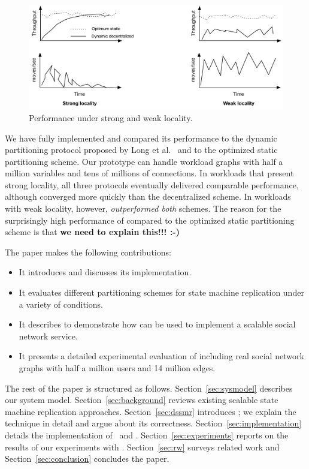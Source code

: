 \begin{figure}[ht]
	\center
	\includegraphics[width=0.6\linewidth]{figures/motivation}
	\caption{Performance under strong and weak locality.}
	\label{fig:motivation}
\end{figure}



\smallskip


We have fully implemented \dynastar and compared its performance to
the dynamic partitioning protocol proposed by Long et
al.~\cite{hoang2016} and to the optimized static partitioning scheme.
Our prototype can handle workload graphs with half a million variables
and tens of millions of connections.  In workloads that present strong
locality, all three protocols eventually delivered comparable
performance, although \dynastar converged more quickly than the
decentralized scheme.  In workloads with weak locality, however,
\dynastar \emph{outperformed both} schemes.  The reason for the
surprisingly high performance of \dynastar compared to the optimized
static partitioning scheme is that \textbf{we need to explain this!!!
  :-)}

The paper makes the following contributions:
\begin{itemize}
\item It introduces \dynastar and discusses its implementation. 
\item It evaluates different partitioning schemes for state machine replication under a variety of conditions.
\item It describes \appname{} to demonstrate how \libname{} can be used to implement a scalable social network service.
\item It presents a detailed experimental evaluation of \dynastar including real social network graphs with half a million users and 14 million edges.
\end{itemize}

The rest of the paper is structured as follows.
Section~\ref{sec:sysmodel} describes our system model.
Section~\ref{sec:background} reviews existing scalable state machine replication approaches.
Section~\ref{sec:dssmr} introduces \dssmr{}; we explain the technique in detail and argue about its correctness.
Section~\ref{sec:implementation} details the implementation of \libname\ and \appname{}.
Section~\ref{sec:experiments} reports on the results of our experiments with \dssmr{}.
Section~\ref{sec:rw} surveys related work and
Section~\ref{sec:conclusion} concludes the paper.



